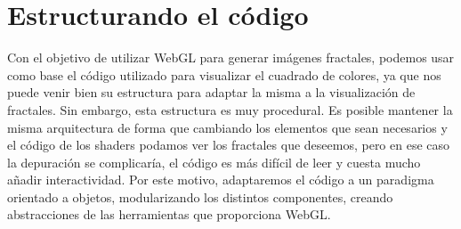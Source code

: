 \section{Estructurando el código}
\label{section:codigo}

Con el objetivo de utilizar WebGL para generar imágenes fractales, podemos usar como base el código utilizado para visualizar el cuadrado de colores, ya que nos puede venir bien su estructura para adaptar la misma a la visualización de fractales. Sin embargo, esta estructura es muy procedural. Es posible mantener la misma arquitectura de forma que cambiando los elementos que sean necesarios y el código de los shaders podamos ver los fractales que deseemos, pero en ese caso la depuración se complicaría, el código es más difícil de leer y cuesta mucho añadir interactividad. Por este motivo, adaptaremos el código a un paradigma orientado a objetos, modularizando los distintos componentes, creando abstracciones de las herramientas que proporciona WebGL.

